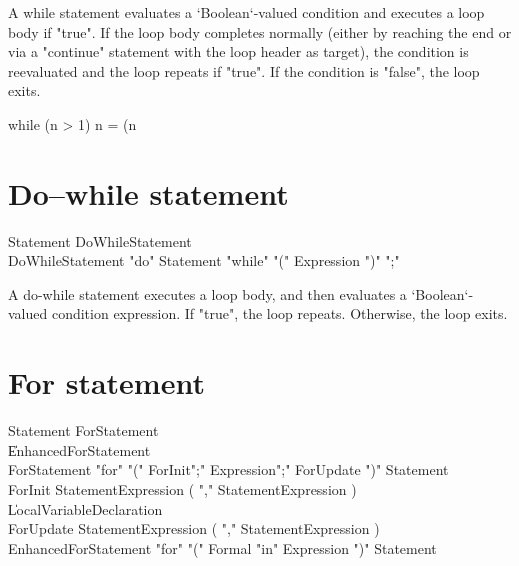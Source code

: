 A while statement evaluates a \xcd`Boolean`-valued condition and executes a
loop body if \xcd"true". If the loop body completes normally (either by
reaching the end or via a \xcd"continue" statement with the loop header as
target), the condition is reevaluated and the loop repeats if \xcd"true". If
the condition is \xcd"false", the loop exits.

\begin{xten}
  while (n > 1) {
     n = (n %
  }
\end{xten}

\section{Do--while statement}

\begin{grammar}
Statement \: DoWhileStatement \\
DoWhileStatement \: \xcd"do" Statement \xcd"while" \xcd"(" Expression \xcd")" \xcd";" \\
\end{grammar}


A do-while statement executes a loop body, and then evaluates a
\xcd`Boolean`-valued condition expression. If \xcd"true", the loop repeats.
Otherwise, the loop exits.



\section{For statement}

\begin{grammar}
Statement \: ForStatement \\
          \| EnhancedForStatement \\
ForStatement \: \xcd"for" \xcd"("
        ForInit\opt \xcd";" Expression\opt \xcd";" ForUpdate\opt
        \xcd")" Statement \\
ForInit \:
        StatementExpression ( \xcd"," StatementExpression )\star
        \\
      \| LocalVariableDeclaration \\
ForUpdate \:
        StatementExpression ( \xcd"," StatementExpression )\star\\
EnhancedForStatement \: \xcd"for" \xcd"("
        Formal \xcd"in" Expression 
        \xcd")" Statement \\
\end{grammar}

